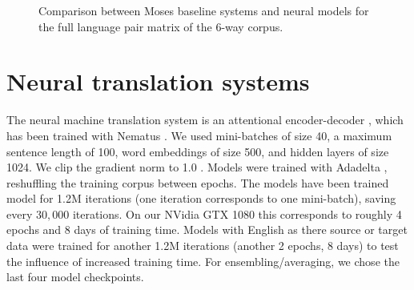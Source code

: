 \documentclass[11pt]{article}
\begin{document}
\begin{figure*}[p]
\centering
{}
\caption{Comparison between Moses baseline systems and neural models for the full language pair matrix of the 6-way corpus.}\label{pbsmtnmt1}
\end{figure*}

\section{Neural translation systems}

The neural machine translation system is an attentional encoder-decoder \cite{DBLP:journals/corr/BahdanauCB14}, which has been trained with Nematus  \cite{DBLP:conf/wmt/SennrichHB16}.
We used mini-batches of size 40, a maximum sentence length of 100, word embeddings of size 500, and hidden layers of size 1024.
We clip the gradient norm to 1.0 \cite{DBLP:conf/icml/PascanuMB13}.
Models were trained with Adadelta \cite{DBLP:journals/corr/abs-1212-5701}, reshuffling the training corpus between epochs.
The models have been trained model for 1.2M iterations (one iteration corresponds to one mini-batch), saving every $30,000$ iterations. On our NVidia GTX 1080 this corresponds to roughly 4 epochs and 8 days of training time. Models with English as there source or target data were trained for another 1.2M iterations (another 2 epochs, 8 days) to test the influence of increased training time. For ensembling/averaging, we chose the last four model checkpoints.
\end{document}
